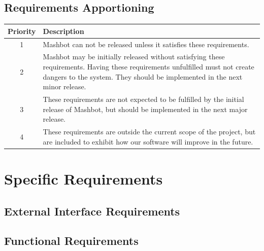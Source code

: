 \documentclass{report}
\begin{document}
	\subsection{Requirements Apportioning} %
        \begin{tabular}{|c|p{4in}|}
          \hline
          \textbf{Priority} & \textbf{Description} \\
          \hline \hline
          1 & Mashbot can not be released unless it satisfies these
              requirements. \\
          \hline
          2 & Mashbot may be initially released without satisfying these
              requirements. Having these requirements unfulfilled must
              not create dangers to the system. They should be implemented in the next
              minor release. \\
          \hline
          3 & These requirements are not expected to be fulfilled by
              the initial release of Mashbot, but should be
              implemented in the next major release. \\
          \hline
          4 & These requirements are outside the current scope of the
              project, but are included to exhibit how our software
              will improve in the future. \\
          \hline
        \end{tabular}

\section{Specific Requirements}
	\subsection{External Interface Requirements} %
	\subsection{Functional Requirements}
\end{document}
